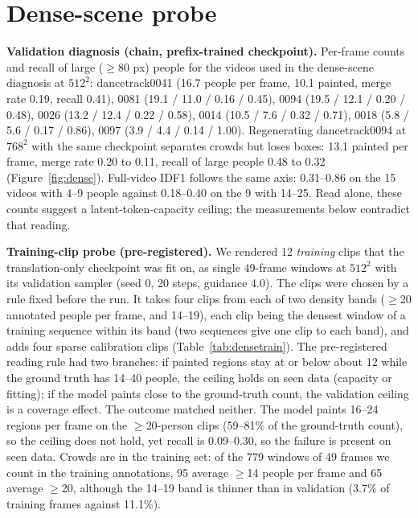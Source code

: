 \documentclass{article} %
\newcommand{\rev}[1]{{\color{blue}#1}}
\begin{document}
\section{Dense-scene probe}
\label{app:dense}
\rev{\textbf{Validation diagnosis (chain, prefix-trained checkpoint).}}
Per-frame counts and recall of large ($\geq$80 px) people for the videos used in the
dense-scene diagnosis at $512^2$: dancetrack0041 (16.7 people per frame, 10.1 painted,
merge rate 0.19, recall 0.41), 0081 (19.1 / 11.0 / 0.16 / 0.45), 0094 (19.5 / 12.1 / 0.20 /
0.48), 0026 (13.2 / 12.4 / 0.22 / 0.58), 0014 (10.5 / 7.6 / 0.32 / 0.71), 0018 (5.8 / 5.6 /
0.17 / 0.86), 0097 (3.9 / 4.4 / 0.14 / 1.00). Regenerating dancetrack0094 at $768^2$ with the
same checkpoint separates crowds but loses boxes: 13.1 painted per frame, merge rate 0.20 to
0.11, recall of large people 0.48 to 0.32 (Figure~\ref{fig:dense}). Full-video IDF1 follows
the same axis: \rev{0.31}--0.86 on the \rev{15} videos with 4--9 people against 0.18--\rev{0.40} on the \rev{9} with
14--25\rev{. Read alone, these counts suggest a latent-token-capacity ceiling;
the measurements below contradict that reading.}

\rev{\textbf{Training-clip probe (pre-registered).} We rendered 12 \emph{training} clips
that the translation-only checkpoint was fit on, as single 49-frame windows at $512^2$ with
its validation sampler (seed 0, 20 steps, guidance 4.0). The clips were chosen by a rule fixed
before the run. It takes four clips from each of two density bands ($\geq$20 annotated people
per frame, and 14--19), each clip being the densest window of a training sequence within its band (two
sequences give one clip to each band), and adds four sparse calibration clips
(Table~\ref{tab:densetrain}). The pre-registered reading rule had two
branches: if painted regions stay at or below about 12 while the ground truth has 14--40
people, the ceiling holds on seen data (capacity or fitting); if the model paints close to
the ground-truth count, the validation ceiling is a coverage effect. The outcome matched
neither. The model paints 16--24 regions per frame on the $\geq$20-person clips (59--81\% of
the ground-truth count), so the ceiling does not hold, yet recall is 0.09--0.30, so the
failure is present on seen data. Crowds are in the training set: of the 779 windows of 49 frames
we count in the training annotations, 95 average $\geq$14 people per frame and 65 average $\geq$20, although the 14--19 band is
thinner than in validation (3.7\% of training frames against 11.1\%).}
\end{document}
